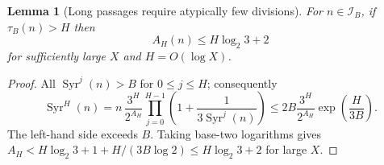 \documentclass[11pt]{amsart}
\newtheorem{lemma}{Lemma}
\theoremstyle{remark}\newtheorem{remark}{Remark}
\newcommand{\Syr}{\operatorname{Syr}}
\begin{document}
\begin{lemma}[Long passages require atypically few divisions]\label{lem:late}
For $n\in\mathcal I_B$, if $\tau_B(n)>H$ then
\begin{equation}\label{eq:lowtail}
 A_H(n)\le H\log_2 3+2
\end{equation}
for sufficiently large $X$ and $H=O(\log X)$.
\end{lemma}
\begin{proof}
All $\Syr^j(n)>B$ for $0\le j\le H$; consequently
\[
 \Syr^H(n)=n\,\frac{3^H}{2^{A_H}}\prod_{j=0}^{H-1}
 \left(1+\frac1{3\Syr^j(n)}\right)
 \le 2B\frac{3^H}{2^{A_H}}\exp\!\left(\frac H{3B}\right).
\]
The left-hand side exceeds $B$.  Taking base-two logarithms gives
$A_H<H\log_2 3+1+H/(3B\log2)\le H\log_2 3+2$ for large $X$.
\end{proof}
\end{document}
